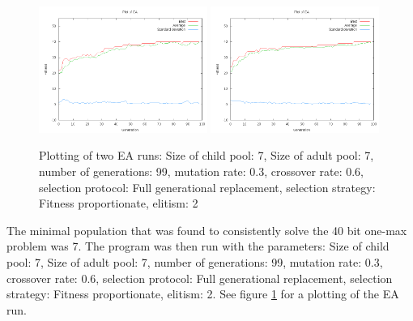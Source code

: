 \documentclass[11pt]{article}
\begin{document}
\begin{figure}[ht]
\begin{center}
\mbox{\includegraphics[width=0.49\textwidth]{images/11.png}}
\mbox{\includegraphics[width=0.49\textwidth]{images/12.png}}
\end{center}
\caption{Plotting of two EA runs:
Size of child pool: 7,
Size of adult pool: 7,
number of generations: 99,
mutation rate: 0.3,
crossover rate: 0.6,
selection protocol: Full generational replacement,
selection strategy: Fitness proportionate,
elitism: 2}
\label{fig:1}
\end{figure}

The minimal population that was found to consistently solve the 40 bit one-max
problem was 7. The program was then run with the parameters: 
Size of child pool: 7,
Size of adult pool: 7,
number of generations: 99,
mutation rate: 0.3,
crossover rate: 0.6,
selection protocol: Full generational replacement,
selection strategy: Fitness proportionate,
elitism: 2.
See figure \ref{fig:1} for a plotting of the EA run.
\end{document}
